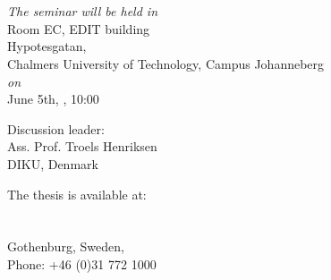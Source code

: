 \documentclass[10pt,a4paper,onecolumn,english]{book}
\begin{document}
\frontmatter


\renewcommand{\thepage}{}

\thispagestyle{empty} %
\begin{center}
\end{center}



\begin{center} {\LARGE \textbf{\mytitle}}
\ifx\mysubtitle\undefined
\else
  \\
  \vspace{0.4cm}
  \textit{\large\mysubtitle}
\fi
\end{center}

\vspace{5mm}
\begin{center}
\textsc{\large\authorname} \\
\end{center}
\vspace{5mm}

\begin{center}
\textit{The seminar will be held in}\\
\vskip 2mm
Room EC, EDIT building \\
Hypotesgatan,\\
Chalmers University of Technology, Campus Johanneberg\\
\vskip 1mm
\textit{on}\\
\vskip 1mm
June 5th, \currentyear, 10:00\\

\vspace{1cm}

Discussion leader:\\
Ass. Prof. Troels Henriksen\\
DIKU, Denmark
\end{center}

\vspace{1cm}


\begin{center}
The thesis is available at:\\
\mydepartment\\
\chalIgu\\
Gothenburg, Sweden, \currentyear\\
\vspace{1cm}
Phone: +46 (0)31 772 1000
\end{center}
\end{document}

